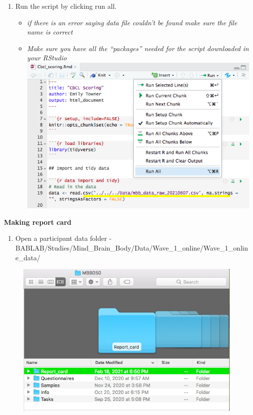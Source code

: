\documentclass[]{book}
\providecommand{\tightlist}{%
  \setlength{\itemsep}{0pt}\setlength{\parskip}{0pt}}
\begin{document}
\begin{enumerate}
\def\labelenumi{\arabic{enumi}.}
\setcounter{enumi}{3}
\tightlist
\item
  Run the script by clicking run all.

  \begin{itemize}
  \tightlist
  \item
    \emph{if there is an error saying data file couldn't be found make sure the file name is correct}
  \item
    \emph{Make sure you have all the ``packages'' needed for the script downloaded in your RStudio}
    \includegraphics{images/report_card_online/8.png}
  \end{itemize}
\end{enumerate}

\textbf{Making report card}

\begin{enumerate}
\def\labelenumi{\arabic{enumi}.}
\tightlist
\item
  Open a participant data folder - BABLAB/Studies/Mind\_Brain\_Body/Data/Wave\_1\_online/Wave\_1\_online\_data/
\end{enumerate}

\begin{figure}
\centering
\includegraphics{images/report_card_online/1.png}
\caption{}
\end{figure}
\end{document}
